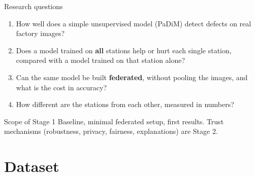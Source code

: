 \documentclass[aspectratio=169,10pt]{beamer}
\begin{document}
\begin{frame}{Research questions}
  \begin{enumerate}
    \item How well does a simple unsupervised model (PaDiM) detect defects on
          real factory images?
    \item Does a model trained on \textbf{all} stations help or hurt each single
          station, compared with a model trained on that station alone?
    \item Can the same model be built \textbf{federated}, without pooling the
          images, and what is the cost in accuracy?
    \item How different are the stations from each other, measured in numbers?
  \end{enumerate}
  \vspace{0.3cm}
  \begin{alertblock}{Scope of Stage 1}
    Baseline, minimal federated setup, first results.
    Trust mechanisms (robustness, privacy, fairness, explanations) are Stage 2.
  \end{alertblock}
\end{frame}

\section{Dataset}
\end{document}
